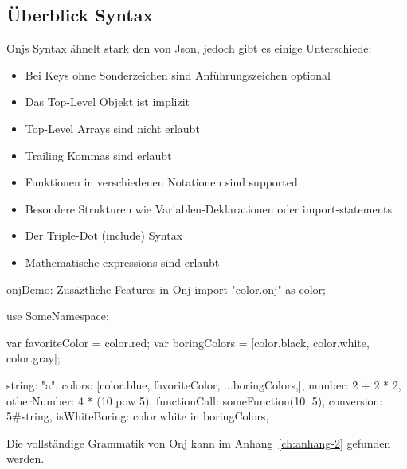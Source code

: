
\subsection{Überblick Syntax}\label{subsec:ueberblick-syntax}

\renewcommand{\kapitelautor}{Autor: Marvin Kurka}

Onjs Syntax ähnelt stark den von Json, jedoch gibt es einige Unterschiede:
\begin{itemize}
    \item Bei Keys ohne Sonderzeichen sind Anführungszeichen optional
    \item Das Top-Level Objekt ist implizit
    \item Top-Level Arrays sind nicht erlaubt
    \item Trailing Kommas sind erlaubt
    \item Funktionen in verschiedenen Notationen sind supported
    \item Besondere Strukturen wie Variablen-Deklarationen oder import-statements
    \item Der Triple-Dot (include) Syntax
    \item Mathematische expressions sind erlaubt
\end{itemize}

\begin{codeBlock}{onj}{Demo: Zusäztliche Features in Onj}
import "color.onj" as color;

use SomeNamespace;

var favoriteColor = color.red;
var boringColors = [color.black, color.white, color.gray];

string: "a\nstring",
colors: [color.blue, favoriteColor, ...boringColors,],
number: 2 + 2 * 2,
otherNumber: 4 * (10 pow 5),
functionCall: someFunction(10, 5),
conversion: 5#string,
isWhiteBoring: color.white in boringColors,
\end{codeBlock}

\begin{infoBox}
Die vollständige Grammatik von Onj kann im Anhang~\ref{ch:anhang-2} gefunden werden.
\end{infoBox}

\renewcommand{\kapitelautor}{}
